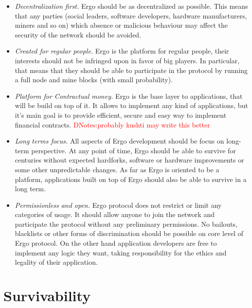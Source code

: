 \documentclass[]{article}
\newcommand{\dnote}[1]{{\textcolor{red}{DNotes:{#1}}}}
\newcommand{\Ergo}{Ergo}
\begin{document}
    \begin{itemize}
        \item{\em Decentralization first.} \Ergo{} should be as decentralized as possible.
        This means that any parties (social leaders, software developers, hardware manufacturers, miners and so on)
        which absence or malicious behaviour may affect the security of the network should be avoided.
        \item{\em Created for regular people.} \Ergo{} is the platform for regular people, their interests should
        not be infringed upon in favor of big players. In particular, that means that they should be able to
        participate in the protocol by running a full node and mine blocks (with small probability).
        \item{\em Platform for Contractual money.} \Ergo{} is the base layer to applications, that will be
        build on top of it. It allows to implement any kind of applications, but it's main goal is
        to provide efficient, secure and easy way to implement financial contracts. \dnote{probably kushti may write this better}
        \item{\em Long terms focus.} All aspects of \Ergo{} development should be focus on long-term perspective.
        At any point of time, \Ergo{} should be able to survive for centuries without expected hardforks,
        software or hardware improvements or some other unpredictable changes. As far as \Ergo{} is oriented
        to be a platform, applications built on top of \Ergo{} should also be able to survive in a long term.
        \item{\em Permissionless and open.} \Ergo{} protocol does not restrict or limit any categories of usage.
        It should allow anyone to join the network and participate the protocol without any preliminary permissions.
        No bailouts, blacklists or other forms of discrimination should be possible on core level of \Ergo{} protocol.
        On the other hand application developers are free to implement any logic they want, taking responsibility
        for the ethics and legality of their application.
    \end{itemize}


    \section{Survivability}
    \label{sec:survivability}

\end{document}
